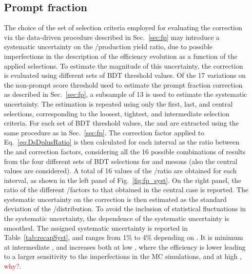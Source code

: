 \subsection{Prompt fraction}
The choice of the set of selection criteria employed for evaluating the \fp correction via the data-driven procedure described in Sec.~\ref{sec:fp} may introduce a systematic uncertainty on the \ds/\dpl production yield ratio, due to possible imperfections in the description of the efficiency evolution as a function of the applied selections. To estimate the magnitude of this uncertainty, the \fp correction is evaluated using different sets of BDT threshold values. Of the 17 variations on the non-prompt score threshold used to estimate the prompt fraction correction as described in Sec.~\ref{sec:fp}, a subsample of 13 is used to estimate the systematic uncertainty. The \fp estimation is repeated using only the first, last, and central selections, corresponding to the loosest, tightest, and intermediate selection criteria. For each set of BDT threshold values, the \fpds and \fpdpl are extracted using the same procedure as in Sec.~\ref{sec:fp}. The correction factor applied to Eq.~\ref{eq:DsDplusRatio} is then calculated for each \pt interval as the ratio between the \fpds and \fpdpl correction factors, considering all the 16 possible combinations of results from the four different sets of BDT selections for \ds and \dpl mesons (also the central values are considered). A total of 16 values of the \fpds/\fpdpl ratio are obtained for each \pt interval, as shown in the left panel of Fig.~\ref{fig:fp_syst}. On the right panel, the ratio of the different \fpds/\fpdpl factors to that obtained in the central case is reported. The systematic uncertainty on the \fp correction is then estimated as the standard deviation of the \fpds/\fpdpl distribution. To avoid the inclusion of statistical fluctuations in the systematic uncertainty, the \pt dependence of the systematic uncertainty is smoothed. The assigned systematic uncertainty is reported in Table~\ref{tab:recapSyst}, and ranges from 1\% to 4\% depending on \pt. It is minimum at intermediate \pt, and increases both at low \pt, where the efficiency is lower leading to a larger sensitivity to the imperfections in the MC simulations, and at high \pt, \textcolor{red}{why?}.

